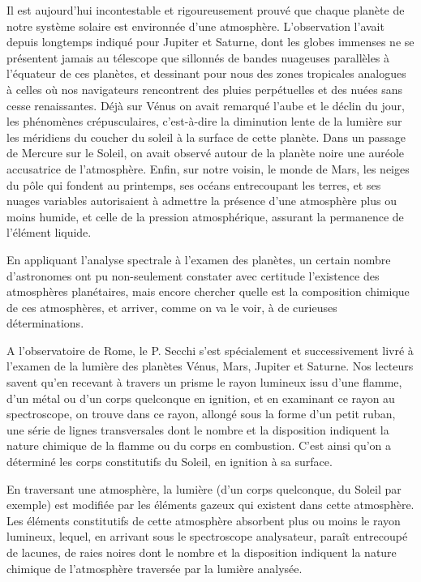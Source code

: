 \documentclass[a4paper, 11pt, oneside, landscape]{article}
\begin{document}
Il est aujourd'hui incontestable et rigoureusement prouvé que chaque planète de notre système solaire est environnée d'une atmosphère. L'observation l'avait depuis longtemps indiqué pour Jupiter et Saturne, dont les globes immenses ne se présentent jamais au télescope que sillonnés de bandes nuageuses parallèles à l'équateur de ces planètes, et dessinant pour nous des zones tropicales analogues à celles où nos navigateurs rencontrent des pluies perpétuelles et des nuées sans cesse renaissantes. Déjà sur Vénus on avait remarqué l'aube et le déclin du jour, les phénomènes crépusculaires, c'est-à-dire la diminution lente de la lumière sur les méridiens du coucher du soleil à la surface de cette planète. Dans un passage de Mercure sur le Soleil, on avait observé autour de la planète noire une auréole accusatrice de l'atmosphère. Enfin, sur notre voisin, le monde de Mars, les neiges du pôle qui fondent au printemps, ses océans entrecoupant les terres, et ses nuages variables autorisaient à admettre la présence d'une atmosphère plus ou moins humide, et celle de la pression atmosphérique, assurant la permanence de l'élément liquide.

En appliquant l'analyse spectrale à l'examen des planètes, un certain nombre d'astronomes ont pu non-seulement constater avec certitude l'existence des atmosphères planétaires, mais encore chercher quelle est la composition chimique de ces atmosphères, et arriver, comme on va le voir, à de curieuses déterminations.

A l'observatoire de Rome, le P. Secchi s'est spécialement et successivement livré à l'examen de la lumière des planètes Vénus, Mars, Jupiter et Saturne. Nos lecteurs savent qu'en recevant à travers un prisme le rayon lumineux issu d'une flamme, d'un métal ou d'un corps quelconque en ignition, et en examinant ce rayon au spectroscope, on trouve dans ce rayon, allongé sous la forme d'un petit ruban, une série de lignes transversales dont le nombre et la disposition indiquent la nature chimique de la flamme ou du corps en combustion. C'est ainsi qu'on a déterminé les corps constitutifs du Soleil, en ignition à sa surface.

En traversant une atmosphère, la lumière (d'un corps quelconque, du Soleil par exemple) est modifiée par les éléments gazeux qui existent dans cette atmosphère. Les éléments constitutifs de cette atmosphère absorbent plus ou moins le rayon lumineux, lequel, en arrivant sous le spectroscope analysateur, paraît entrecoupé de lacunes, de raies noires dont le nombre et la disposition indiquent la nature chimique de l'atmosphère traversée par la lumière analysée.
\end{document}
